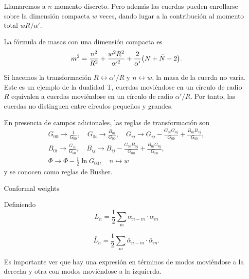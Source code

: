 Llamaremos a $n$ momento discreto.
Pero además las cuerdas pueden enrollarse sobre la dimensión compacta $w$ veces, dando lugar
a la contribución al momento total $wR/\alpha'$.

La fórmula de masas con una dimensión compacta es
\begin{equation}
  m^2 = \frac{n^2}{R^2} + \frac{w^2 R^2}{\alpha'^2} +\frac{2}{\alpha'}\qty(N+\bar N -2).
\end{equation}

Si hacemos la transformación $R\leftrightarrow \alpha'/R$ y $n\leftrightarrow w$, la
masa de la cuerda no varía. 
Este es un ejemplo de la dualidad T, cuerdas moviéndose en un círculo de radio $R$ equivalen
a cuerdas moviéndose en un círculo de radio $\alpha'/R$.
Por tanto, las cuerdas no distinguen entre círculos pequeños y grandes.

En presencia de campos adicionales, las reglas de transformación son
\begin{equation}
  \begin{gathered}
    G_{00}\to \frac{1}{G_{00}}, \quad G_{0i}\to \frac{B_{0i}}{G_{00}},\quad G_{ij}\to G_{ij} -\frac{G_{0i}G_{0j}}{G_{00}}+\frac{B_{0i}B_{0j}}{G_{00}}, \\
    B_{0i}\to\frac{G_{0i}}{G_{00}},\quad B_{ij}\to B_{ij}-\frac{G_{0i}B_{0j}}{G_{00}}+\frac{B_{0i}G_{0j}}{G_{00}},\\
    \Phi\to\Phi-\frac{1}{2}\ln G_{00},\quad n\leftrightarrow w
  \end{gathered}
\end{equation}
y se conocen como reglas de Busher.


Conformal weights

Definiendo
\begin{equation}
  L_n=\frac 1 2 \sum_m \alpha_{n-m} \cdot \alpha_m
\end{equation}

\begin{equation}
  \bar{L}_n=\frac 1 2 \sum_m \bar{\alpha}_{n-m} \cdot \bar{\alpha}_m.
\end{equation}

Es importante ver que hay una expresión en términos de modos moviéndose a la derecha
y otra con modos moviéndose a la izquierda.

